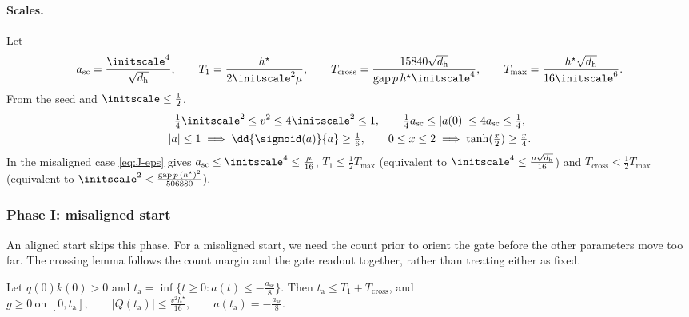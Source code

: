 \paragraph{Scales.} Let
\[
 a_{\mathrm{sc}}=\frac{\initscale^4}{\sqrt{d_{\mathrm h}}},\qquad T_1=\frac{h^\star}{2\initscale^2\mu},\qquad
 T_{\mathrm{cross}}=\frac{15840\sqrt{d_{\mathrm h}}}{\mathrm{gap}\,p\,h^\star\initscale^4},\qquad T_{\max}=\frac{h^\star\sqrt{d_{\mathrm h}}}{16\initscale^6}.
\]
From the seed and $\initscale\le\frac{1}{2}$,
\begin{equation}
 \begin{gathered}
 \tfrac{1}{4}\initscale^2\le v^2\le4\initscale^2\le1,\qquad \tfrac{1}{4}a_{\mathrm{sc}}\le|a(0)|\le4a_{\mathrm{sc}}\le\tfrac{1}{4},\\
 |a|\le1\implies\dd{\sigmoid(a)}{a}\ge\tfrac{1}{6},\qquad 0\le x\le2\implies\tanh(\tfrac{x}{2})\ge\tfrac{x}{4} .
 \end{gathered}
 \label{eq:J-scales}
\end{equation}
In the misaligned case \cref{eq:J-eps} gives $a_{\mathrm{sc}}\le\initscale^4\le\frac{\mu}{16}$, $T_1\le\frac{1}{2}T_{\max}$ (equivalent to $\initscale^4\le\frac{\mu\sqrt{d_{\mathrm h}}}{16}$) and
$T_{\mathrm{cross}}<\frac{1}{2}T_{\max}$ (equivalent to $\initscale^2<\frac{\mathrm{gap}\,p\,(h^\star)^2}{506880}$).

\subsubsection{Phase I: misaligned start}

An aligned start skips this phase. For a misaligned start, we need the count prior to orient the gate before the other parameters
move too far. The crossing lemma follows the count margin and the gate readout together, rather than treating either as fixed.

\begin{lemma}[Crossing]
\label{lem:J-cross}
Let $q(0)k(0)>0$ and $t_{\mathrm a}=\inf\{t\ge0:a(t)\le-\frac{a_{\mathrm{sc}}}{8}\}$. Then $t_{\mathrm a}\le T_1+T_{\mathrm{cross}}$, and
 $g\ge0\ \text{on }[0,t_{\mathrm a}],\qquad |Q(t_{\mathrm a})|\le\frac{v^2h^\star}{16},\qquad a(t_{\mathrm a})=-\frac{a_{\mathrm{sc}}}{8}.$ 
\end{lemma}

